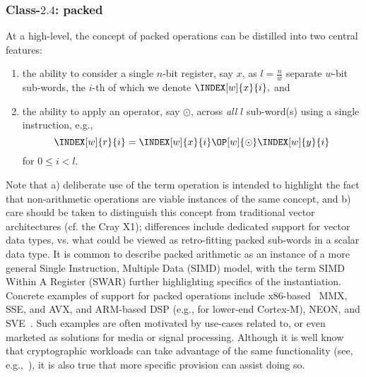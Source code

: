 


\subsubsection{Class-$2.4$: packed}
\label{sec:spec:instruction:2:4}

At a high-level, the concept of packed operations can be distilled into two 
central features:

\begin{enumerate}
\item the ability to consider a single $n$-bit register, 
      say $x$, 
      as $l = \frac{n}{w}$ separate $w$-bit sub-words, the $i$-th of which
      we denote
      $
      \INDEX[w]{x}{i} ,
      $
      and
\item the ability to apply an operator,
      say $\odot$,
      across {\em all} $l$ sub-word(s) using a single instruction, e.g.,
      \[
      \INDEX[w]{r}{i} = \INDEX[w]{x}{i} \OP[w]{\odot} \INDEX[w]{y}{i}
      \]
      for $0 \leq i < l$.
\end{enumerate}

\noindent
Note that
a) deliberate use of the term operation is intended to highlight the fact 
   that non-arithmetic operations are viable instances of the same concept,
   and
b) care should be taken to distinguish this concept from traditional vector 
   architectures
   (cf. the Cray X1);
   differences include dedicated support for vector data types, vs. what
   could be viewed as retro-fitting packed sub-words in a scalar data type.
It is common to describe packed arithmetic as an instance of a more general
Single Instruction, Multiple Data (SIMD) model, with the term SIMD Within 
A Register (SWAR) further highlighting specifics of the instantiation.
Concrete examples of support for packed operations include
x86-based~\cite[Section 2.2.7]{SCARV:X86:2:18} MMX, SSE, and AVX,
and
ARM-based DSP (e.g., for lower-end Cortex-M), NEON, and SVE~\cite{SCARV:SBBEEGHMMPRRW:17}.
Such examples are often motivated by use-cases related to, or even marketed 
as solutions for media or signal processing.  Although it is well know that
cryptographic workloads can take advantage of the same functionality
(see, e.g.,~\cite{SCARV:Hamburg:09,SCARV:BerSch:12}),
it is also true that more specific provision can assist doing so.  


